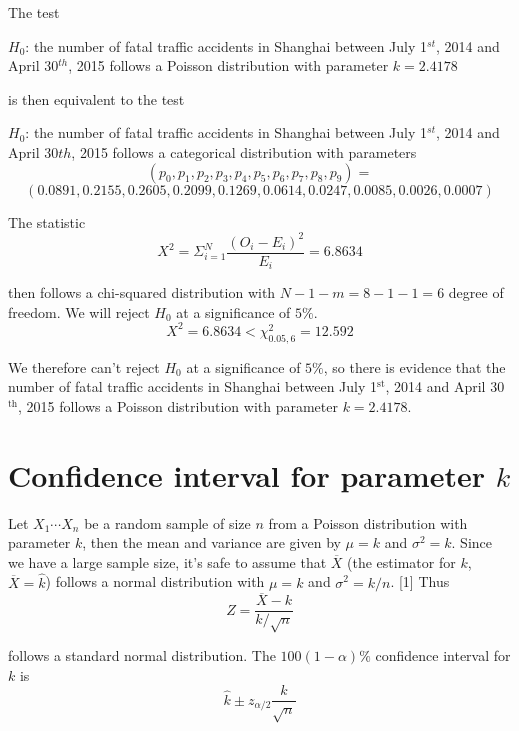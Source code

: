 \documentclass[a4paper,12pt]{article}
\begin{document}
\noindent The test
\begin{center}
$H_0$: the number of fatal traffic accidents in Shanghai between July 1$^{st}$, 2014 and April 30$^{th}$, 2015 follows a Poisson distribution with parameter $k=2.4178$
\end{center}
 \noindent is then equivalent to the test
\begin{center}
$H_0$: the number of fatal traffic accidents in Shanghai between July 1$^{st}$, 2014 and April 30${th}$, 2015 follows a categorical distribution with parameters $$(p_0,p_1,p_2,p_3,p_4,p_5,p_6,p_7,p_8,p_9)=$$ $$(0.0891,0.2155,0.2605,0.2099,0.1269,0.0614,0.0247,0.0085,0.0026,0.0007)$$
\end{center}

\noindent The statistic
\begin{equation}
X^2=\Sigma_{i=1}^N \frac{(O_i-E_i)^2}{E_i}=6.8634
\end{equation}

\noindent then follows a chi-squared distribution with $N-1-m=8-1-1=6$ degree of freedom. We will reject $H_0$ at a significance of $5\%$.
\begin{equation}
X^2=6.8634<\chi^2_{0.05,6}=12.592
\end{equation}

\noindent We therefore can't reject $H_0$ at a significance of $5\%$, so there is evidence that
 the number of fatal traffic accidents in Shanghai between July 1$^{\text{st}}$, 2014 and April 30$^{\text{th}}$, 2015 follows a Poisson distribution with parameter $k=2.4178$. 
 \section{Confidence interval for parameter $k$}
\noindent Let $X_1\cdots X_n$ be a random sample of size $n$ from a Poisson distribution with parameter $k$, then the mean and variance are given by $\mu=k$ and $\sigma^2=k$. Since we have a large sample size, it's safe to assume that $\overline{X}$ (the estimator for $k$, $\overline{X}=\widehat{k}$) follows a normal distribution with  $\mu=k$ and $\sigma^2=k/n$. [1] Thus
\begin{equation}
Z=\frac{\overline{X}-k}{k/\sqrt{n}}
\end{equation}

\noindent follows a standard normal distribution. The $100(1-\alpha)\%$ confidence interval for $k$ is 
\begin{equation}
\widehat{k}\pm z_{\alpha/2}\frac{k}{\sqrt{n}}
\end{equation}
\end{document}

